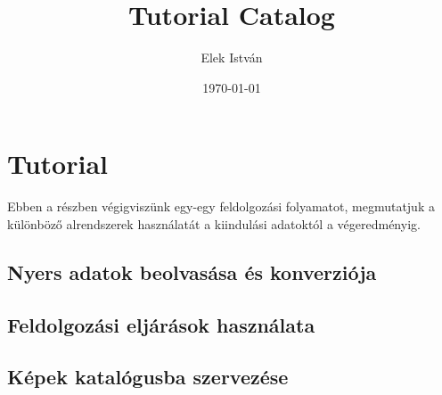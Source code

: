 \documentclass[a4paper,12pt]{article}
\begin{document}
	
	\author{Elek István}
	
	\title{Tutorial  \linebreak  \linebreak \small Catalog \linebreak \linebreak}
	
	
	\date{\today}
	
	
	\setcounter{tocdepth}{3}
	\maketitle
	\newpage
	\tableofcontents
	\newpage


\section{Tutorial}

Ebben a részben végigviszünk egy-egy feldolgozási folyamatot, megmutatjuk a különböző alrendszerek használatát a kiindulási adatoktól a végeredményig.

\subsection{Nyers adatok beolvasása és konverziója}

\subsection{Feldolgozási eljárások használata}

\subsection{Képek katalógusba szervezése}
\end{document}
